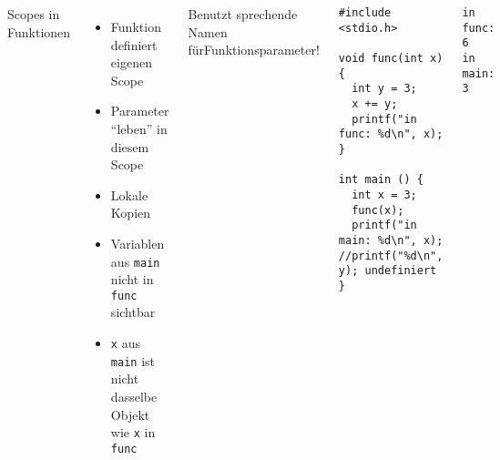 \begin{frame}[fragile]%
%
\begin{columns}[b]
\begin{Large}
\vspace{10pt}
Scopes in Funktionen
\vspace{6pt}
\end{Large}
\begin{itemize}
\item Funktion definiert eigenen Scope
\item Parameter \enquote{leben} in diesem Scope
\item Lokale Kopien
\item Variablen aus \texttt{main} nicht in \texttt{func} sichtbar
\item \texttt{x} aus \texttt{main} ist nicht dasselbe Objekt wie \texttt{x} in \texttt{func}
\end{itemize}
%
\begin{hintbox}
Benutzt sprechende Namen für\newline Funktionsparameter!
\end{hintbox}
%
\begin{codebox}
\begin{verbatim}
#include <stdio.h>

void func(int x) {
  int y = 3;
  x += y;
  printf("in func: %d\n", x);
}

int main () {
  int x = 3;   
  func(x);   
  printf("in main: %d\n", x);
//printf("%d\n", y); undefiniert
}
\end{verbatim}
\end{codebox}
%
\begin{cmdbox}[Ausgabe]
\begin{verbatim}
in func: 6
in main: 3
\end{verbatim}
\end{cmdbox}
\end{columns}
%
\end{frame}


